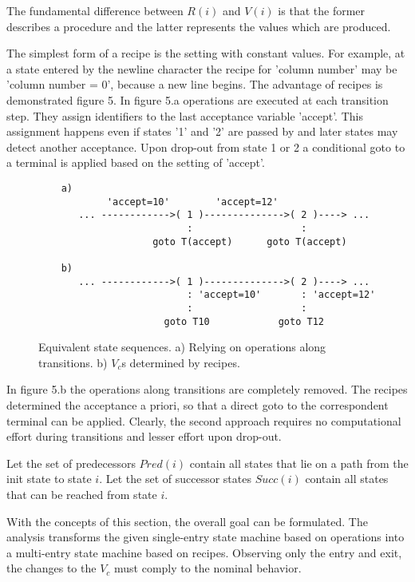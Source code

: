 \documentclass[12pt,a4paper]{scrartcl}
\begin{document}
The fundamental difference between $R(i)$ and $V(i)$ is that the former describes
a procedure and the latter represents the values which are produced.

The simplest form of a recipe is the setting with constant values.  For
example, at a state entered by the newline character the recipe for 'column
number' may be 'column number = 0', because a new line begins. The advantage of
recipes is demonstrated figure 5.  In figure 5.a operations are executed at
each transition step. They assign identifiers to the last acceptance variable
'accept'. This assignment happens even if states '1' and '2' are passed by and
later states may detect another acceptance. Upon drop-out from state 1 or 2 a
conditional goto to a terminal is applied based on the setting of 'accept'. 

\begin{figure}[htbp] \leavevmode
\begin{verbatim}
    a)        
            'accept=10'        'accept=12'        
       ... ------------>( 1 )-------------->( 2 )----> ...
                          :                   :
                    goto T(accept)      goto T(accept)

    b) 
       ... ------------>( 1 )-------------->( 2 )----> ...
                          : 'accept=10'       : 'accept=12'              
                          :                   :
                      goto T10            goto T12

\end{verbatim}
\caption{Equivalent state sequences. a) Relying on operations along
transitions. b) $V_c$s determined by recipes.}
\end{figure}


In figure 5.b the operations along transitions are completely removed. The
recipes determined the acceptance a priori, so that a direct goto to the
correspondent terminal can be applied.  Clearly, the second approach requires
no computational effort during transitions and lesser effort upon drop-out.

Let the set of predecessors $Pred(i)$ contain all states that lie on a path
from the init state to state $i$. Let the set of successor states $Succ(i)$
contain all states that can be reached from state $i$.

With the concepts of this section, the overall goal can be formulated. The
analysis transforms the given single-entry state machine based on operations
into a multi-entry state machine based on recipes. Observing only the entry and
exit, the changes to the $V_c$ must comply to the nominal behavior. 
\end{document}
